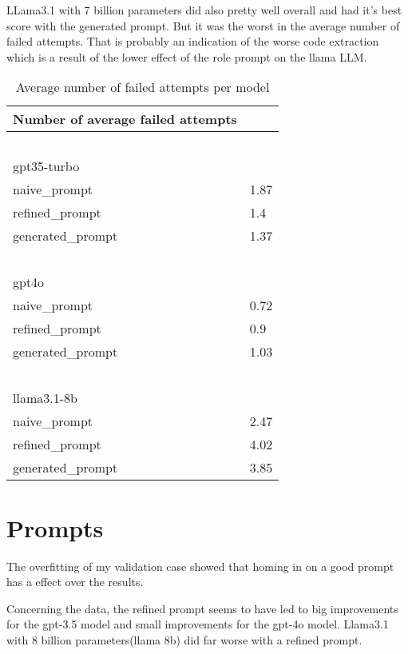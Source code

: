 \documentclass[a4paper,11pt,oneside]{memoir}
\begin{document}
LLama3.1 with 7 billion parameters did also pretty well overall and had it's best score with the generated prompt. But it was the worst in the average number of failed attempts. That is probably an indication of the worse code extraction which is a result of the lower effect of the role prompt on the llama LLM.

\begin{table}[!ht]
    \centering
    \begin{tabular}{|l|l|}
    \hline
        Number of average failed attempts & ~ \\ \hline
        ~ & ~ \\ \hline
        gpt35-turbo & ~ \\ \hline
          naive\_prompt & 1.87 \\ \hline
          refined\_prompt & 1.4 \\ \hline
          generated\_prompt & 1.37 \\ \hline
        ~ & ~ \\ \hline
        gpt4o & ~ \\ \hline
          naive\_prompt & 0.72 \\ \hline
          refined\_prompt & 0.9 \\ \hline
          generated\_prompt & 1.03 \\ \hline
        ~ & ~ \\ \hline
        llama3.1-8b & ~ \\ \hline
          naive\_prompt & 2.47 \\ \hline
          refined\_prompt & 4.02 \\ \hline
          generated\_prompt & 3.85 \\ \hline
    \end{tabular}
    \caption{Average number of failed attempts per model}
\end{table}


\section{Prompts}

The overfitting of my validation case showed that homing in on a good prompt has a effect over the results.

Concerning the data, the refined prompt seems to have led to big improvements for the gpt-3.5 model and small improvements for the gpt-4o model. Llama3.1 with 8 billion parameters(llama 8b) did far worse with a refined prompt.
\end{document}
